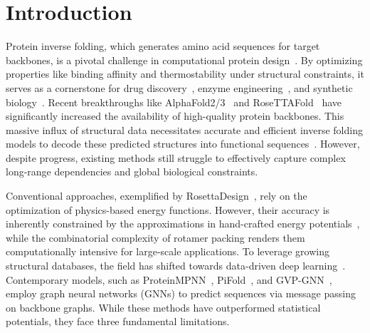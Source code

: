 \documentclass{article}
\theoremstyle{plain}
\theoremstyle{definition}
\theoremstyle{remark}
\begin{document}
\section{Introduction}

Protein inverse folding, which generates amino acid sequences for target backbones, is a pivotal challenge in computational protein design~\cite{ingraham2019generative, dauparas2022robust}. By optimizing properties like binding affinity and thermostability under structural constraints, it serves as a cornerstone for drug discovery~\cite{imrie2020deep, ovchinnikov2021structure}, enzyme engineering~\cite{mazurenko2020machine}, and synthetic biology~\cite{yeh2023novo, cao2022design}. Recent breakthroughs like AlphaFold2/3~\cite{jumper2021highly, abramson2024accurate} and RoseTTAFold~\cite{baek2021accurate} have significantly increased the availability of high-quality protein backbones. This massive influx of structural data necessitates accurate and efficient inverse folding models to decode these predicted structures into functional sequences~\cite{ferruz2022controllable}. However, despite progress, existing methods still struggle to effectively capture complex long-range dependencies and global biological constraints.

Conventional approaches, exemplified by RosettaDesign~\cite{leaver2011rosetta3, alford2017rosetta}, rely on the optimization of physics-based energy functions. However, their accuracy is inherently constrained by the approximations in hand-crafted energy potentials~\cite{dahiyat1997probing}, while the combinatorial complexity of rotamer packing renders them computationally intensive for large-scale applications. To leverage growing structural databases, the field has shifted towards data-driven deep learning~\cite{ovchinnikov2021structure}. Contemporary models, such as ProteinMPNN~\cite{dauparas2022robust}, PiFold~\cite{gao2022pifold}, and GVP-GNN~\cite{jing2020learning}, employ graph neural networks (GNNs) to predict sequences via message passing on backbone graphs. While these methods have outperformed statistical potentials, they face three fundamental limitations. 
\end{document}
